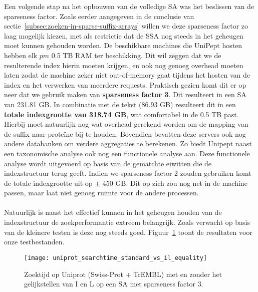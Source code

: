 Een volgende stap na het opbouwen van de volledige SA was het beslissen van de sparseness factor.
Zoals eerder aangegeven in de conclusie van sectie~\ref{subsec:zoeken-in-sparse-suffix-arrays} willen we deze sparseness factor zo laag mogelijk kiezen, met als restrictie dat de SSA nog steeds in het geheugen moet kunnen gehouden worden.
De beschikbare machines die UniPept hosten hebben elk $pm$ 0.5 TB RAM ter beschikking.
Dit wil zeggen dat we de resulterende index hierin moeten krijgen, en ook nog genoeg overhead moeten laten zodat de machine zeker niet out-of-memory gaat tijdens het hosten van de index en het verwerken van meerdere requests.
Praktisch gezien komt dit er op neer dat we gebruik maken van \textbf{sparseness factor 3}.
Dit resulteert in een SA van 231.81 GB\@.
In combinatie met de tekst (86.93 GB) resulteert dit in een \textbf{totale indexgrootte van 318.74 GB}, wat comfortabel in de 0.5 TB past.
Hierbij moet natuurlijk nog wat overhead gerekend worden om de mapping van de suffix naar proteïne bij te houden.
Bovendien bevatten deze servers ook nog andere databanken om verdere aggregaties te berekenen.
Zo biedt Unipept naast een taxonomische analyse ook nog een functionele analyse aan.
Deze functionele analyse wordt uitgevoerd op basis van de gematchte eiwitten die de indexstructuur terug geeft.
Indien we sparseness factor 2 zouden gebruiken komt de totale indexgrootte uit op $\pm$ 450 GB\@.
Dit op zich zou nog net in de machine passen, maar laat niet genoeg ruimte voor de andere processen.
\\ \\
Natuurlijk is naast het effectief kunnen in het geheugen houden van de indexstructuur de zoekperformantie extreem belangrijk.
Zoals verwacht op basis van de kleinere testen is deze nog steeds goed.
Figuur~\ref{fig:uniprot_search} toont de resultaten voor onze testbestanden.

\begin{figure}[ht]
    \centering
    \texttt{[image: uniprot\_searchtime\_standard\_vs\_il\_equality]}
    \caption{Zoektijd op Uniprot (Swiss-Prot + TrEMBL) met en zonder het gelijkstellen van I en L op een SA met sparseness factor 3.}
    \label{fig:uniprot_search}
\end{figure}

